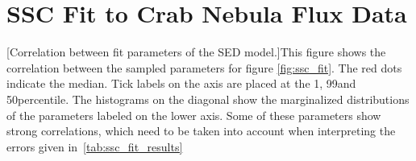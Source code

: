 \section{SSC Fit to Crab Nebula Flux Data}
\label{ap:ssc_fit}
\noindent%
\begin{minipage}{\linewidth}%
[Correlation between fit parameters of the \naima SED model.]{This figure shows the correlation between the sampled parameters for figure \ref{fig:ssc_fit}.
The red dots indicate the median. Tick labels on the axis are placed at the 1\th, 99\th and 50\th percentile.
The histograms on the diagonal show the marginalized distributions of the parameters labeled on the lower axis.
Some of these parameters show strong correlations, which need to be taken into account when interpreting the 
errors given in~\ref{tab:ssc_fit_results}\label{fig:ssc_correlation}}%
\end{minipage}
